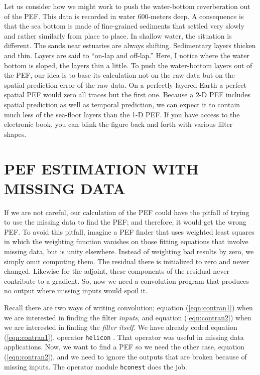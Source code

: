 
\par
Let us consider how we might work
to push the water-bottom reverberation out of the PEF.
This data is recorded in water 600-meters deep.
A consequence is that the sea bottom is made of fine-grained sediments
that settled very slowly and rather similarly from place to place.
In shallow water, the situation is different.
The sands near estuaries are always shifting.
Sedimentary layers thicken and thin.
Layers are said to ``on-lap and off-lap.''
Here,
I notice where the water bottom is sloped,
the layers thin a little.
To push the water-bottom layers out of the PEF,
our idea is to base its calculation not on the raw data
but on the spatial prediction error of the raw data.
On a perfectly layered Earth
a perfect spatial PEF would zero all traces but the first one.
Because a 2-D PEF includes spatial prediction as well as temporal
prediction, we can expect it to contain much less of the sea-floor
layers than the 1-D PEF.
If you have access to the electronic book, you can blink
the figure back and forth with various filter shapes.





\section{PEF ESTIMATION WITH MISSING DATA}
\par
If we are not careful,
our calculation of the PEF
could have the pitfall of trying to use the missing
data to find the PEF;
and therefore, it would get the wrong PEF.
To avoid this pitfall,
imagine a PEF finder that uses weighted least squares
in which the weighting function
vanishes on those fitting equations that involve missing data,
but is unity elsewhere.
Instead of weighting bad results by zero,
we simply omit computing them.
The residual there is initialized to zero and never changed.
Likewise for the adjoint,
these components of the residual never contribute to a gradient.
So,
now we need a convolution program
that produces no output where missing inputs would spoil it.

\par
Recall there are two ways of writing convolution;
equation (\ref{eqn:contran1})
when we are interested in finding the filter
{\em inputs}, and
equation (\ref{eqn:contran2})
when we are interested in finding the
{\em filter itself}.
We have already coded
equation (\ref{eqn:contran1}),
operator
\texttt{helicon} .
That operator was useful in missing data applications.
Now, we want to find a PEF
so we need the other case,
equation (\ref{eqn:contran2}),
and we need to ignore the outputs
that are broken because of missing inputs.
The operator module
\texttt{hconest} does the job.

